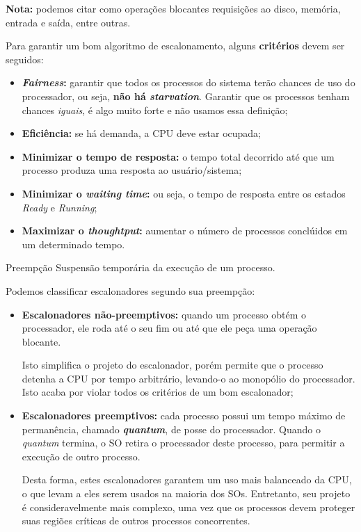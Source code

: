 \textbf{Nota:} podemos citar como operações blocantes requisições ao disco, memória, entrada e saída, entre outras.

Para garantir um bom algoritmo de escalonamento, alguns \textbf{critérios} devem ser seguidos:
\begin{itemize}
  \item \textbf{\textit{Fairness}:} garantir que todos os processos do sistema terão chances de uso do processador, ou seja, \textbf{não há \textit{starvation}}. Garantir que os processos tenham chances \textit{iguais}, é algo muito forte e não usamos essa definição;

  \item \textbf{Eficiência:} se há demanda, a CPU deve estar ocupada;

  \item \textbf{Minimizar o tempo de resposta:} o tempo total decorrido até que um processo produza uma resposta ao usuário/sistema;

  \item \textbf{Minimizar o \textit{waiting time}:} ou seja, o tempo de resposta entre os estados \textit{Ready} e \textit{Running};

  \item \textbf{Maximizar o \textit{thoughtput}:} aumentar o número de processos conclúidos em um determinado tempo.
\end{itemize}

\begin{definicao}{Preempção}
  Suspensão temporária da execução de um processo.
\end{definicao}

Podemos classificar escalonadores segundo sua preempção:

\begin{itemize}
  \item \textbf{Escalonadores não-preemptivos:} quando um processo obtém o processador, ele roda até o seu fim ou até que ele peça uma operação blocante.

  Isto simplifica o projeto do escalonador, porém permite que o processo detenha a CPU por tempo arbitrário, levando-o ao monopólio do processador. Isto acaba por violar todos os critérios de um bom escalonador;

  \item \textbf{Escalonadores preemptivos:} cada processo possui um tempo máximo de permanência, chamado \textbf{\textit{quantum}}, de posse do processador. Quando o \textit{quantum} termina, o SO retira o processador deste processo, para permitir a execução de outro processo.

  Desta forma, estes escalonadores garantem um uso mais balanceado da CPU, o que levam a eles serem usados na maioria dos SOs. Entretanto, seu projeto é consideravelmente mais complexo, uma vez que os processos devem proteger suas regiões críticas de outros processos concorrentes.
\end{itemize}


